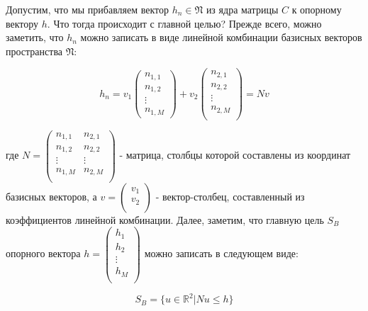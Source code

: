 \documentclass[a4paper, 12pt, titlepage]{article}
\theoremstyle{definition}
\theoremstyle{plain}
\theoremstyle{plain}
\begin{document}
Допустим, что мы прибавляем вектор $h_{n} \in \mathfrak{N}$ из ядра матрицы $C$
к опорному вектору $h$. Что тогда происходит с главной целью? Прежде всего,
можно заметить, что $h_{n}$ можно записать в виде линейной комбинации базисных
векторов пространства $\mathfrak{N}$:

\begin{equation}
h_{n} = v_{1} \left(
  \begin{array}{c}
   n_{1, 1} \\
   n_{1, 2} \\
   \vdots \\
   n_{1, M}
  \end{array}
  \right) + v_{2} \left(
  \begin{array}{c}
   n_{2, 1} \\
   n_{2, 2} \\
   \vdots \\
   n_{2, M} \\
  \end{array}
  \right) = N v
\end{equation}

где $N = \left(
     \begin{array}{cc}
      n_{1, 1} & n_{2, 1} \\
      n_{1, 2} & n_{2, 2} \\
      \vdots & \vdots \\
      n_{1, M} & n_{2, M} \\
     \end{array}
     \right)$ - матрица, столбцы которой составлены из координат базисных
векторов, а
$v = \left(
     \begin{array}{c}
      v_{1} \\
      v_{2} \\
     \end{array}
     \right)$ - вектор-столбец, составленный из коэффициентов линейной
комбинации. Далее, заметим, что главную цель $S_{B}$ опорного вектора
$h = \left(
  \begin{array}{c}
   h_{1} \\
   h_{2} \\
   \vdots \\
   h_{M} \\
  \end{array}
  \right)$ можно записать в следующем виде:

\begin{equation}
S_{B} = \{u \in \mathbb{R}^{2} | N u \leq h\}
\end{equation}
\end{document}
